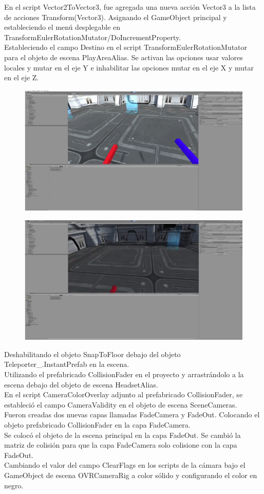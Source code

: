En el script Vector2ToVector3, fue agregada una nueva acción Vector3 a la lista de acciones Transform(Vector3). Asignando el GameObject principal y estableciendo el menú 
desplegable en TransformEulerRotationMutator/DoIncrementProperty.\\
Estableciendo el campo Destino en el script TransformEulerRotationMutator para el objeto de escena PlayAreaAlias. Se activan las opciones usar valores locales y mutar en el eje Y 
e inhabilitar las opciones mutar en el eje X y mutar en el eje Z.\\
\begin{figure}[H]
	\begin{center}
 		\includegraphics[width = .5\textwidth]{source/images/image47.png}
	\end{center} 
\end{figure}
\begin{figure}[H]
	\begin{center}
 		\includegraphics[width = .5\textwidth]{source/images/image71.png}
	\end{center} 
\end{figure}
Deshabilitando el objeto SnapToFloor debajo del objeto Teleporter\_.InstantPrefab en la escena.\\
Utilizando el prefabricado CollisionFader en el proyecto y arrastrándolo a la escena debajo del objeto de escena HeadsetAlias.\\
En el script CameraColorOverlay adjunto al prefabricado CollisionFader, se estableció el campo CameraValidity en el objeto de escena SceneCameras.\\
Fueron creadas dos nuevas capas llamadas FadeCamera y FadeOut. Colocando el objeto prefabricado CollisionFader en la capa FadeCamera.\\
Se colocó el objeto de la escena principal en la capa FadeOut. Se cambió la matriz de colisión para que la capa FadeCamera solo colisione con la capa FadeOut.\\
Cambiando el valor del campo ClearFlags en los scripts de la cámara bajo el GameObject de escena OVRCameraRig a color sólido y configurando el color en negro.\\

